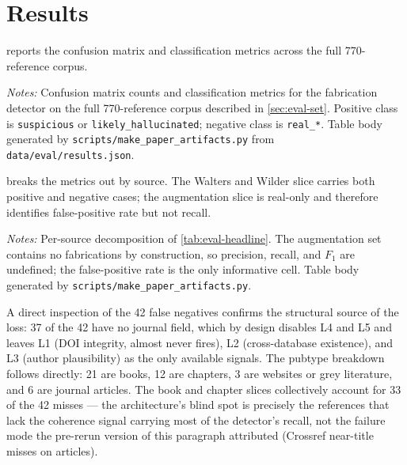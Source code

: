 \documentclass[12pt]{article}
\begin{document}
\section{Results}\label{sec:results}

 reports the confusion matrix and classification metrics across the full 770-reference corpus.

\begin{table}[htbp]
\centering
\caption{Fabrication-detection metrics on the labeled corpus}
\label{tab:eval-headline}
\begin{threeparttable}

\begin{tablenotes}\small
\item \textit{Notes:} Confusion matrix counts and classification metrics for the fabrication detector on the full 770-reference corpus described in \cref{sec:eval-set}. Positive class is \texttt{suspicious} or \texttt{likely\_hallucinated}; negative class is \texttt{real\_*}. Table body generated by \texttt{scripts/make\_paper\_artifacts.py} from \texttt{data/eval/results.json}.
\end{tablenotes}
\end{threeparttable}
\end{table}

 breaks the metrics out by source. The Walters and Wilder slice carries both positive and negative cases; the augmentation slice is real-only and therefore identifies false-positive rate but not recall.

\begin{table}[htbp]
\centering
\caption{Metrics by source}
\label{tab:eval-bysource}
\begin{threeparttable}

\begin{tablenotes}\small
\item \textit{Notes:} Per-source decomposition of \cref{tab:eval-headline}. The augmentation set contains no fabrications by construction, so precision, recall, and $F_1$ are undefined; the false-positive rate is the only informative cell. Table body generated by \texttt{scripts/make\_paper\_artifacts.py}.
\end{tablenotes}
\end{threeparttable}
\end{table}

A direct inspection of the 42 false negatives confirms the structural source of the loss: 37 of the 42 have no journal field, which by design disables L4 and L5 and leaves L1 (DOI integrity, almost never fires), L2 (cross-database existence), and L3 (author plausibility) as the only available signals. The pubtype breakdown follows directly: 21 are books, 12 are chapters, 3 are websites or grey literature, and 6 are journal articles. The book and chapter slices collectively account for 33 of the 42 misses --- the architecture's blind spot is precisely the references that lack the coherence signal carrying most of the detector's recall, not the failure mode the pre-rerun version of this paragraph attributed (Crossref near-title misses on articles).
\end{document}
